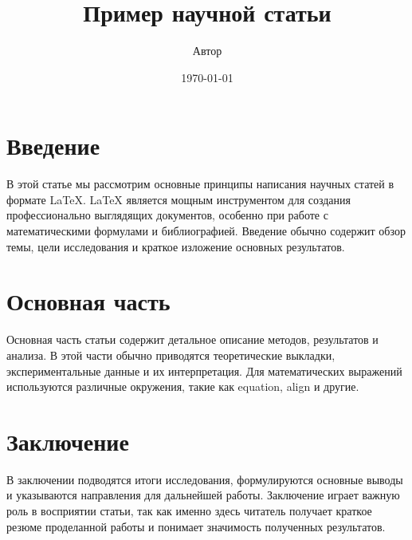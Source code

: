 \documentclass{article}
\title{Пример научной статьи}
\author{Автор}
\date{\today}
\begin{document}
\maketitle

\section{Введение}
В этой статье мы рассмотрим основные принципы написания научных статей в формате \LaTeX. \LaTeX{} является мощным инструментом для создания профессионально выглядящих документов, особенно при работе с математическими формулами и библиографией. Введение обычно содержит обзор темы, цели исследования и краткое изложение основных результатов.

\section{Основная часть}
Основная часть статьи содержит детальное описание методов, результатов и анализа. В этой части обычно приводятся теоретические выкладки, экспериментальные данные и их интерпретация. Для математических выражений используются различные окружения, такие как equation, align и другие.

\section{Заключение}
В заключении подводятся итоги исследования, формулируются основные выводы и указываются направления для дальнейшей работы. Заключение играет важную роль в восприятии статьи, так как именно здесь читатель получает краткое резюме проделанной работы и понимает значимость полученных результатов.



\end{document}
